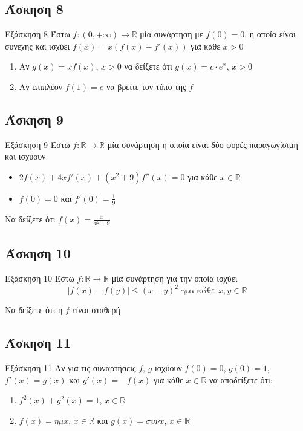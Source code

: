 \documentclass[greek]{beamer}
\begin{document}
\subsection{Άσκηση 8}
\begin{frame}[label=Άσκηση8]{Εξάσκηση 8}
 Έστω $f:(0,+\infty)\to\mathbb{R}$ μία συνάρτηση με $f(0)=0$, η οποία είναι συνεχής και ισχύει $f(x)=x(f(x)-f'(x))$ για κάθε $x>0$
 \begin{enumerate}
   \item<1-> Αν $g(x)=xf(x)$, $x>0$ να δείξετε ότι $g(x)=c\cdot e^x$, $x>0$
   \item<2-> Αν επιπλέον $f(1)=e$ να βρείτε τον τύπο της $f$
 \end{enumerate}

\end{frame}

\subsection{Άσκηση 9}
\begin{frame}[label=Άσκηση9]{Εξάσκηση 9}
 Έστω $f:\mathbb{R}\to\mathbb{R}$ μία συνάρτηση η οποία είναι δύο φορές παραγωγίσιμη και ισχύουν
 \begin{itemize}
   \item $2f(x)+4xf'(x)+(x^2+9)f''(x)=0$ για κάθε $x\in\mathbb{R}$
   \item $f(0)=0$ και $f'(0)=\frac{1}{9}$
 \end{itemize}

 Να δείξετε ότι $f(x)=\frac{x}{x^2+9}$

\end{frame}

\subsection{Άσκηση 10}
\begin{frame}[label=Άσκηση10]{Εξάσκηση 10}
 Έστω $f:\mathbb{R}\to\mathbb{R}$ μία συνάρτηση για την οποία ισχύει
 $$|f(x)-f(y)|\le (x-y)^2 \text{ για κάθε } x,y\in\mathbb{R}$$

 Να δείξετε ότι η $f$ είναι σταθερή

\end{frame}

\subsection{Άσκηση 11}
\begin{frame}[label=Άσκηση11]{Εξάσκηση 11}
Αν για τις συναρτήσεις $f$, $g$ ισχύουν $f(0)=0$, $g(0)=1$, $f'(x)=g(x)$ και $g'(x)=-f(x)$ για κάθε $x\in\mathbb{R}$ να αποδείξετε ότι:
\begin{enumerate}
  \item<1-> $f^2(x)+g^2(x)=1$, $x\in\mathbb{R}$
  \item<2-> $f(x)=ημx$, $x\in\mathbb{R}$ και $g(x)=συνx$, $x\in\mathbb{R}$
\end{enumerate}

\end{frame}
\end{document}
